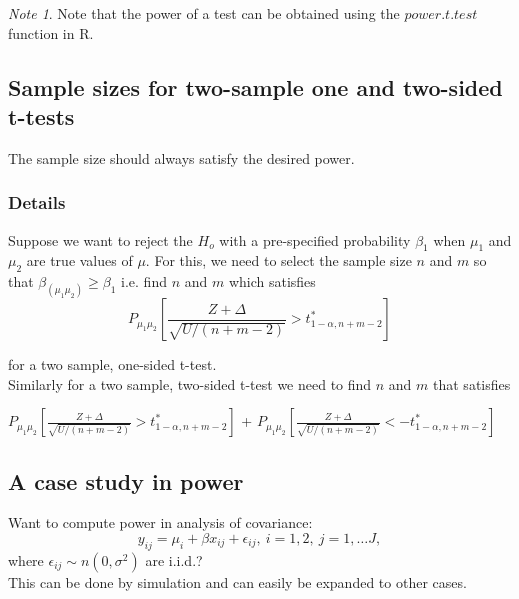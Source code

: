 \documentclass[12pt,a4paper]{article}
\theoremstyle{regla}
\theoremstyle{remark}
\newtheorem{notes}{Note}[section]
\theoremstyle{definition}
\theoremstyle{nonumberbreak}
\begin{document}
\begin{notes}
Note that the power of a test can be obtained using the $power.t.test$ function in R.
\end{notes}

\subsection{Sample sizes for two-sample one and two-sided t-tests}
\begin{fbox}
\begin{minipage}{0.97\textwidth}
The sample size should always satisfy the desired power. 



\end{minipage}
\end{fbox}
\subsubsection{Details}
Suppose we want to reject the $H_o$ with a pre-specified probability $\beta_1$ when $\mu_1$ and $\mu_2$ are true values of $\mu$. For this, we need to select the sample size $n$ and $m$ so that $\beta_(\mu_1\mu_2) \geq \beta_1$ i.e. find $n$ and $m$ which satisfies 
$$ P_{\mu_1\mu_2} \left[ \frac{Z + \Delta}{\sqrt{U/(n+m-2)}} > t^*_{1-\alpha,n+m-2} \right] $$

 
for a two sample, one-sided t-test. \\

Similarly for a two sample, two-sided t-test we need to find $n$ and $m$ that satisfies 

$ P_{\mu_1\mu_2}\left[ \frac{Z + \Delta}{\sqrt{U/(n+m-2)}} > t^*_{1-\alpha,n+m-2} \right]$ +
$ P_{\mu_1\mu_2} \left[\frac{Z + \Delta}{\sqrt{U/(n+m-2)}} < -t^*_{1-\alpha,n+m-2} \right]$



\subsection{A case study in power}
\begin{fbox}
\begin{minipage}{0.97\textwidth}
Want to compute power in analysis of covariance:
$$
y_{ij}=\mu_i+\beta x_{ij}+\epsilon_{ij} , \ i=1, 2,\ j=1,\ldots J,
$$
where $\epsilon_{ij}\sim n(0,\sigma^ 2)$ are i.i.d.?\\

This can be done by simulation and can easily be expanded to other cases.


\end{minipage}
\end{fbox}
\end{document}
